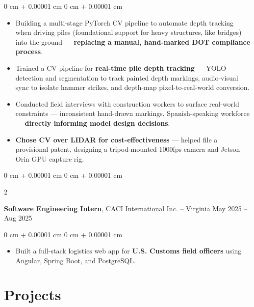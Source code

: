 \documentclass[10pt, letterpaper]{article}
\newenvironment{highlights}{
    \begin{itemize}[
        topsep=0.3 cm,
        parsep=0.06 cm,
        partopsep=0pt,
        itemsep=0.02 cm,
        leftmargin=0 cm + 10pt
    ]
}{
    \end{itemize}
} %
\newenvironment{onecolentry}{
    \begin{adjustwidth}{
        0 cm + 0.00001 cm
    }{
        0 cm + 0.00001 cm
    }
}{
    \end{adjustwidth}
} %
\newenvironment{twocolentry}[2][]{
    \onecolentry
    \def\secondColumn{#2}
    \setcolumnwidth{\fill, 4.5 cm}
    \begin{paracol}{2}
}{
    \switchcolumn \raggedleft \secondColumn
    \end{paracol}
    \endonecolentry
} %
\begin{document}
        \vspace{0.075 cm}
        \begin{onecolentry}
            \begin{highlights}
                \item Building a multi-stage PyTorch CV pipeline to automate depth tracking when driving piles (foundational support for heavy structures, like bridges) into the ground — \textbf{replacing a manual, hand-marked DOT compliance process}.
                \item Trained a CV pipeline for \textbf{real-time pile depth tracking} — YOLO detection and segmentation to track painted depth markings, audio-visual sync to isolate hammer strikes, and depth-map pixel-to-real-world conversion.
                \item Conducted field interviews with construction workers to surface real-world constraints — inconsistent hand-drawn markings, Spanish-speaking workforce — \textbf{directly informing model design decisions}.
                \item \textbf{Chose CV over LIDAR for cost-effectiveness} — helped file a provisional patent, designing a tripod-mounted 1000fps camera and Jetson Orin GPU capture rig.
            \end{highlights}
        \end{onecolentry}

        \vspace{0.075 cm}

        \begin{twocolentry}{
            May 2025 – Aug 2025
        }
            \textbf{Software Engineering Intern}, CACI International Inc. -- Virginia\end{twocolentry}

        \vspace{0.075 cm}
        \begin{onecolentry}
            \begin{highlights}
                \item Built a full-stack logistics web app for \textbf{U.S. Customs field officers} using Angular, Spring Boot, and PostgreSQL.
            \end{highlights}
        \end{onecolentry}

    \section{Projects}
\end{document}
